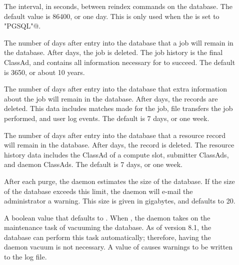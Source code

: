 \begin{description}
\item[] 
  \label{param:QuillDatabaseReindexInterval}
  The interval, in seconds, between reindex commands on the database.
  The default value is 86400, or one day.
  This is only used when the  is set to
  \verb@"PGSQL"@.

\item[]
  \label{param:QuillJobHistoryDuration}
  The number of days after entry into the database that a job will
  remain in the database.
  After  days, the job is deleted.
  The job history is the final ClassAd, and contains all information 
  necessary for  to succeed.
  The default is 3650, or about 10 years. 

\item[]
  \label{param:QuillRunHistoryDuration}
  The number of days after entry into the database that extra information 
  about the job will remain in the database.
  After  days, the records are deleted.
  This data includes matches made for the job, file transfers the job 
  performed, and user log events.
  The default is 7 days, or one week. 

\item[]
  \label{param:QuillResourceHistoryDuration}
  The number of days after entry into the database that a resource record will
  remain in the database.
  After  days, the record is 
  deleted.
  The resource history data includes the ClassAd of a compute slot,
  submitter ClassAds, and daemon ClassAds.
  The default is 7 days, or one week. 

\item[] \label{param:QuillDBSizeLimit}
  After each purge, the  daemon estimates 
  the size of the database. 
  If the size of the database exceeds this limit, 
  the  daemon will e-mail the administrator a warning. 
  This size is given in gigabytes, and defaults to 20. 

\item[]
  \label{param:QuillManageVacuum}
  A boolean value that defaults to .
  When , the  daemon takes on 
  the maintenance task of vacuuming the database.
  As of  version 8.1, the database
  can perform this task automatically; 
  therefore, having the  daemon vacuum is not necessary.
  A value of  causes warnings to be written to the log file.


\end{description}
